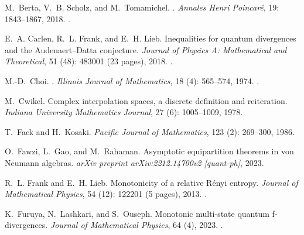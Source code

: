 \documentclass[12pt]{article}
\theoremstyle{definition}
\theoremstyle{remark}
\numberwithin{equation}{section}
\begin{document}
\begin{thebibliography}{27}
M.~Berta, V.~B. Scholz, and M.~Tomamichel.
.
\newblock \emph{Annales Henri Poincar{\'e}}, 19: 1843--1867, 2018.
\newblock {}.


E.~A. Carlen, R.~L. Frank, and E.~H. Lieb.
\newblock Inequalities for quantum divergences and the {Audenaert--Datta}
  conjecture.
\newblock \emph{Journal of Physics A: Mathematical and Theoretical},
  51 (48): 483001 (23 pages), 2018.
\newblock {}.

M.-D.~Choi.
.
\newblock \emph{Illinois Journal of Mathematics}, 18 (4):
  565--574, 1974.
\newblock {}.

M.~Cwikel.
\newblock Complex interpolation spaces, a discrete definition and reiteration.
\newblock \emph{Indiana University Mathematics Journal}, 27 (6):
  1005--1009, 1978.

T.~Fack and H.~Kosaki.
\newblock \emph{Pacific Journal of Mathematics}, 123 (2):
269--300, 1986.
  
O.~Fawzi, L.~Gao, and M.~Rahaman.
\newblock Asymptotic equipartition theorems in von Neumann algebras.
\newblock \emph{arXiv preprint arXiv:2212.14700v2 [quant-ph]}, 2023.

R.~L. Frank and E.~H. Lieb.
\newblock Monotonicity of a relative {R}{\'e}nyi entropy.
\newblock \emph{Journal of Mathematical Physics}, 54 (12):
122201 (5 pages), 2013.
\newblock {}.

K.~Furuya, N.~Lashkari, and S.~Ouseph.
\newblock Monotonic multi-state quantum f-divergences.
\newblock \emph{Journal of Mathematical Physics}, 64 (4), 2023.
\newblock {}.



\end{thebibliography}
\end{document}
